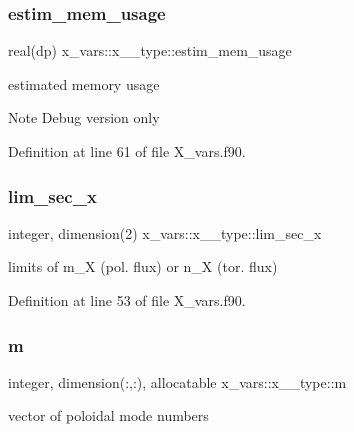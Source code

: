 \subsubsection{\texorpdfstring{estim\+\_\+mem\+\_\+usage}{estim\_mem\_usage}}
{\footnotesize\ttfamily real(dp) x\+\_\+vars\+::x\+\_\+\_\+type\+::estim\+\_\+mem\+\_\+usage}



estimated memory usage 

\begin{DoxyNote}{Note}
Debug version only 
\end{DoxyNote}


Definition at line 61 of file X\+\_\+vars.\+f90.

\mbox{\label{structx__vars_1_1x__1__type_a13c0f5a062916cf55e6bbaa906d0245b}} 
\subsubsection{\texorpdfstring{lim\+\_\+sec\+\_\+x}{lim\_sec\_x}}
{\footnotesize\ttfamily integer, dimension(2) x\+\_\+vars\+::x\+\_\+\_\+type\+::lim\+\_\+sec\+\_\+x}



limits of {\ttfamily m\+\_\+X} (pol. flux) or {\ttfamily n\+\_\+X} (tor. flux) 



Definition at line 53 of file X\+\_\+vars.\+f90.

\mbox{\label{structx__vars_1_1x__1__type_a02aaa9d5638a17b6ed2ab1c46093606c}} 
\subsubsection{\texorpdfstring{m}{m}}
{\footnotesize\ttfamily integer, dimension(\+:,\+:), allocatable x\+\_\+vars\+::x\+\_\+\_\+type\+::m}



vector of poloidal mode numbers 



